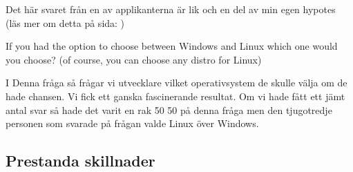 \documentclass[12pt, a4paper]{report}
\begin{document}
Det här svaret från en av applikanterna är lik och en del av min egen hypotes (läs mer om detta på sida: \pageref{slutsats})


   \vspace{3cm}
 
   \large{If you had the option to choose between Windows and Linux which one would you choose? (of course, you can choose any distro for Linux)}
  
   \vspace{.5cm}
  
   \normalsize I Denna fråga så frågar vi utvecklare vilket operativsystem de skulle välja om de hade chansen. Vi fick ett ganska fascinerande resultat. Om vi hade fått ett jämt antal svar så hade det varit en rak 50 50 på denna fråga men den tjugotredje personen som svarade på frågan valde Linux över Windows.
 
   \vspace{1cm}
 
 
   \cite{form}
 
   \vspace{1cm}

   \subsection{Prestanda skillnader}\label{tests}
\end{document}
